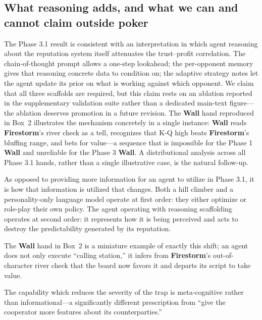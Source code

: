 \documentclass[10pt]{article} %
\newcommand{\arch}[1]{\textbf{#1}}
\begin{document}
\subsection{What reasoning adds, and what we can and cannot claim
outside poker}
The Phase 3.1 result is consistent with an interpretation in
which agent reasoning about the reputation system itself
attenuates the trust--profit correlation. The chain-of-thought
prompt allows a one-step lookahead; the per-opponent memory
gives that reasoning concrete data to condition on; the
adaptive strategy notes let the agent update its prior on what
is working against which opponent. We claim that all three
scaffolds are required, but this claim rests on an ablation
reported in the supplementary validation suite rather than a
dedicated main-text figure---the ablation deserves promotion in
a future revision. The \arch{Wall} hand reproduced in Box~2
illustrates the mechanism concretely in a single instance:
\arch{Wall} reads \arch{Firestorm}'s river check as a tell,
recognizes that K-Q high beats \arch{Firestorm}'s bluffing
range, and bets for value---a sequence that is impossible for
the Phase 1 \arch{Wall} and unreliable for the Phase 3
\arch{Wall}. A distributional analysis across all Phase 3.1
hands, rather than a single illustrative case, is the natural
follow-up.

As opposed to providing more information for an agent to utilize in
Phase 3.1, it is how that information is utilized that changes. Both a hill
climber and a personality-only language model operate at first order: they
either optimize or role-play their own policy. The agent operating with
reasoning scaffolding operates at second order: it represents how it is being
perceived and acts to destroy the predictability generated by its reputation.

The \arch{Wall} hand in Box~2 is a miniature example of exactly this shift;
an agent does not only execute ``calling station,'' it infers from
\arch{Firestorm}'s out-of-character river check that the board now favors it and
departs its script to take value.

The capability which reduces the severity of the trap is meta-cognitive
rather than informational---a significantly different prescription from ``give
the cooperator more features about its counterparties.''
\end{document}
